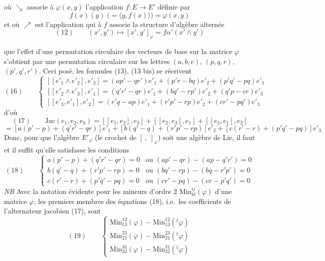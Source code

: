 \documentclass[11pt,a4paper]{article}
\begin{document}
où $\searrow$ associe à $\varphi(x, y)$ l'application $f : E \to E'$ définie
par 
\[
  f(x)(y) \; \bigl(= \langle y, f(x) \rangle\bigr) = \varphi(x, y)
\]
et où $\nearrow$ est l'application qui à $f$ associe la structure d'algèbre alternée
\[
  (12) \qquad (x', y') \longmapsto [x', y']_{\varphi} = f\alpha'(x' \wedge y')
\]

que l'effet d'une permutation circulaire des vecteurs de base sur la matrice
$\varphi$ s'obtient par une permutation circulaire sur les 
lettres $(a, b, c)$, $(p, q, r)$, $(p', q', r')$. Ceci posé, les formules
(13), (13 bis) se récrivent
\[
  (16) \qquad
  \begin{cases}
    [[e'_1 \wedge e'_2], e'_3] = (ap' - qr')e'_1 + (p'r - bq)e'_2 + (p'q' - pq)e'_3 \\
    [[e'_2 \wedge e'_3], e'_1] = (q'r' - qr)e'_1 + (bq' - rp')e'_2 + (q'p - cr)e'_3 \\
    [[e'_3, e'_1], e'_2] = (r'q - ap)e'_1 + (r'p' - rp)e'_2 + (cr' - pq')e'_3
  \end{cases}
\]
d'où
\[
  (17) \qquad \mathrm{Jac}(e_1, e_2, e_3) = [[e_1, e_2], e_3] + [[e_2, e_3], e_1] + [[e_3, e_1], e_2]
\]
\[
  = [a(p' - p) + (q'r' - qr)]e'_1 + [b(q' - q) + (r'p' - rp)]e'_2 + [c(r' - r) + (p'q' - pq)]e'_3
\]
Donc, pour que l'algèbre $E'_{\varphi}$ (le crochet de $[\ ,\ ]_{\varphi}$) soit une
algèbre de Lie, il faut et il suffit qu'elle satisfasse les conditions
\[
  (18) \qquad
  \begin{cases}
    a(p' - p) + (q'r' - qr) = 0 & \text{ou } (ap' - qr) - (ap - q'r') = 0 \\
    b(q' - q) + (r'p' - rp) = 0 & \text{ou } (bq' - rp) - (bq - r'p') = 0 \\
    c(r' - r) + (p'q' - pq) = 0 & \text{ou } (cr' - pq) - (cr - p'q') = 0
  \end{cases}
\]
\emph{NB} Avec la notation évidente pour les mineurs d'ordre 2
$\mathrm{Min}^{ij}_{kl}(\varphi)$ d'une matrice $\varphi$, les premiers membres des
équations (18), i.e.\ les coefficients de l'alternateur jacobien (17), sont
\[
  (19) \qquad
  \begin{cases}
    \mathrm{Min}^{12}_{13}(\varphi) - \mathrm{Min}^{12}_{13}({}^{t}\varphi) \\
    \mathrm{Min}^{23}_{21}(\varphi) - \mathrm{Min}^{23}_{21}({}^{t}\varphi) \\
    \mathrm{Min}^{31}_{32}(\varphi) - \mathrm{Min}^{31}_{32}({}^{t}\varphi)
  \end{cases}
\]
\end{document}
